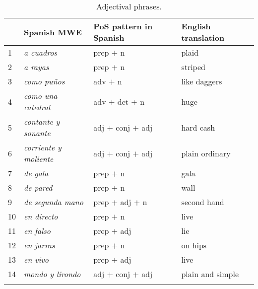 \documentclass[output=paper]{langsci/langscibook}
\begin{document}
\begin{table} 
\caption{Adjectival phrases.}
\label{tab:adjPhrases-fixed}
\begin{tabular}{llll}
\lsptoprule
 & \textbf{Spanish MWE} & \textbf{PoS pattern in Spanish} & \textbf{English translation} \\ 
\midrule
1 & \textit{a cuadros} & prep $+$ n & plaid \\
2 & \textit{a rayas} & prep $+$ n & striped \\
3 & \textit{como puños} & adv $+$ n & like daggers \\
4 & \textit{como una catedral} & adv $+$ det $+$ n & huge \\
5 & \textit{contante y sonante} & adj $+$ conj $+$ adj & hard cash \\
6 & \textit{corriente y moliente} & adj $+$ conj $+$ adj & plain ordinary \\
7 & \textit{de gala} & prep $+$ n & gala \\
8 & \textit{de pared} & prep $+$ n & wall \\
9 & \textit{de segunda mano} & prep $+$ adj $+$ n & second hand \\
10 & \textit{en directo} & prep $+$ n & live \\
11 & \textit{en falso} & prep $+$ adj & lie \\
12 & \textit{en jarras} & prep $+$ n & on hips \\
13 & \textit{en vivo} & prep $+$ adj & live \\
14 & \textit{mondo y lirondo} & adj $+$ conj $+$ adj & plain and simple \\
\lspbottomrule
\end{tabular}
\end{table}
\clearpage
    
\end{document}
